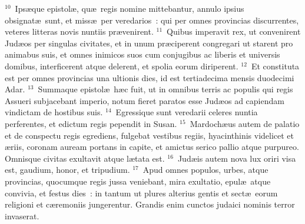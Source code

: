${}^{10}$~Ips\ae que epistol\ae , qu\ae\ regis nomine mittebantur, annulo ipsius obsignat\ae\ sunt, et miss\ae\ per veredarios~: qui per omnes provincias discurrentes, veteres litteras novis nuntiis pr\ae venirent.
${}^{11}$~Quibus imperavit rex, ut convenirent Jud\ae os per singulas civitates, et in unum pr\ae ciperent congregari ut starent pro animabus suis, et omnes inimicos suos cum conjugibus ac liberis et universis domibus, interficerent atque delerent, et spolia eorum diriperent.
${}^{12}$~Et constituta est per omnes provincias una ultionis dies, id est tertiadecima mensis duodecimi Adar.
${}^{13}$~Summaque epistol\ae\ h\ae c fuit, ut in omnibus terris ac populis qui regis Assueri subjacebant imperio, notum fieret paratos esse Jud\ae os ad capiendam vindictam de hostibus suis.
${}^{14}$~Egressique sunt veredarii celeres nuntia perferentes, et edictum regis pependit in Susan.
${}^{15}$~Mardoch\ae us autem de palatio et de conspectu regis egrediens, fulgebat vestibus regiis, hyacinthinis videlicet et \ae riis, coronam auream portans in capite, et amictus serico pallio atque purpureo. Omnisque civitas exultavit atque l\ae tata est.
${}^{16}$~Jud\ae is autem nova lux oriri visa est, gaudium, honor, et tripudium.
${}^{17}$~Apud omnes populos, urbes, atque provincias, quocumque regis jussa veniebant, mira exultatio, epul\ae\ atque convivia, et festus dies~: in tantum ut plures alterius gentis et sect\ae\ eorum religioni et c\ae remoniis jungerentur. Grandis enim cunctos judaici nominis terror invaserat.

